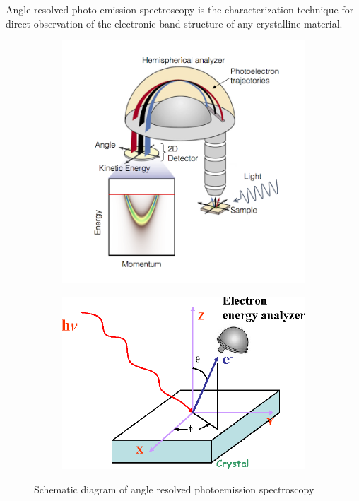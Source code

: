 \documentclass[main.tex]{subfiles}
\begin{document}
\section{}

Angle resolved photo emission spectroscopy is the characterization technique for direct observation of the electronic band structure of any crystalline material. 

\begin{figure}[!htb]
\centering
	\begin{subfigure}[h]{0.5\textwidth}
		\centering
		\includegraphics[width=\linewidth]{arpes1}
  		\caption{}
	\end{subfigure}
	\begin{subfigure}[h]{0.48\textwidth}
  		\centering
  		\includegraphics[width=\linewidth]{arpes2}
  		\caption{}
	\end{subfigure}
\caption{Schematic diagram of angle resolved photoemission spectroscopy}
\label{fig:fig}

\end{figure}
\FloatBarrier
\end{document}
